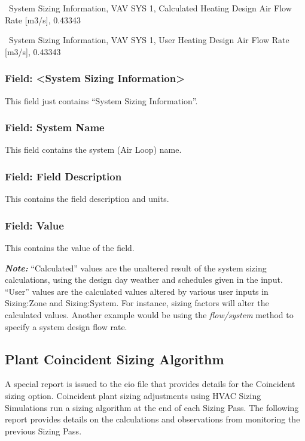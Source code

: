 ~System Sizing Information, VAV SYS 1, Calculated Heating Design Air Flow Rate {[}m3/s{]}, 0.43343

~System Sizing Information, VAV SYS 1, User Heating Design Air Flow Rate {[}m3/s{]}, 0.43343

\subsubsection{Field: \textless{}System Sizing Information\textgreater{}}\label{field-system-sizing-information}

This field just contains ``System Sizing Information''.

\subsubsection{Field: System Name}\label{field-system-name}

This field contains the system (Air Loop) name.

\subsubsection{Field: Field Description}\label{field-field-description}

This contains the field description and units.

\subsubsection{Field: Value}\label{field-value-1}

This contains the value of the field.

\textbf{\emph{Note:}} ``Calculated'' values are the unaltered result of the system sizing calculations, using the design day weather and schedules given in the input. ``User'' values are the calculated values altered by various user inputs in Sizing:Zone and Sizing:System. For instance, sizing factors will alter the calculated values. Another example would be using the \emph{flow/system} method to specify a system design flow rate.

\subsection{Plant Coincident Sizing Algorithm}\label{plant-coincident-sizing-algorithm}

A special report is issued to the eio file that provides details for the Coincident sizing option. Coincident plant sizing adjustments using HVAC Sizing Simulations run a sizing algorithm at the end of each Sizing Pass. The following report provides details on the calculations and observations from monitoring the previous Sizing Pass.

